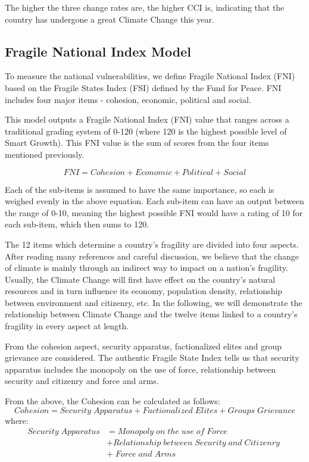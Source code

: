 \documentclass[a4paper,12pt]{article}
\begin{document}
The higher the three change rates are, the higher CCI is, indicating that the country has undergone a great Climate Change this year.


\subsection{Fragile National Index Model}
\label{sec:document-classes}

To measure the national vulnerabilities, we define Fragile National Index (FNI) based on the Fragile States Index (FSI) defined by the Fund for Peace. FNI includes four major items - cohesion, economic, political and social.




This model outputs a Fragile National Index (FNI) value that ranges across a traditional grading system of 0-120 (where 120 is the highest possible level of Smart Growth). This FNI value is the sum of scores from the four items mentioned previously.

\begin{equation}
FNI=Cohesion+Economic+Political+Social
\end{equation}

Each of the sub-items is assumed to have the same importance, so each is weighed evenly in the above equation. Each sub-item can have an output between the range of 0-10, meaning the highest possible FNI would have a rating of 10 for each sub-item, which then sums to 120.

The 12 items which determine a country's fragility are divided into four aspects. After reading many references and careful discussion, we believe that the change of climate is mainly through an indirect way to impact on a nation's fragility. Usually, the Climate Change will first have effect on the country's natural resources and in turn influence its economy, population density, relationship between environment and citizenry, etc. In the following, we will demonstrate the relationship between Climate Change and the twelve items linked to a country's fragility in every aspect at length. 

From the cohesion aspect, security apparatus, factionalized elites and group grievance are considered. The authentic Fragile State Index tells us that security apparatus includes the monopoly on the use of force, relationship between security and citizenry and force and arms.

From the above, the Cohesion can be calculated as follows:
\begin{equation}
Cohesion=Security\;Apparatus+Factionalized\;Elites+Groups\;Grievance
\end{equation}
where:
\begin{equation}
\label{eq7}
\begin{split}
Security\;Apparatus&=Monopoly\;on\;the\;use\;of\;Force\\&+Relationship\;between\;Security\;and\;Citizenry\;\\ &+\;Force\;and\;Arms
\end{split}
\end{equation}
\end{document}
